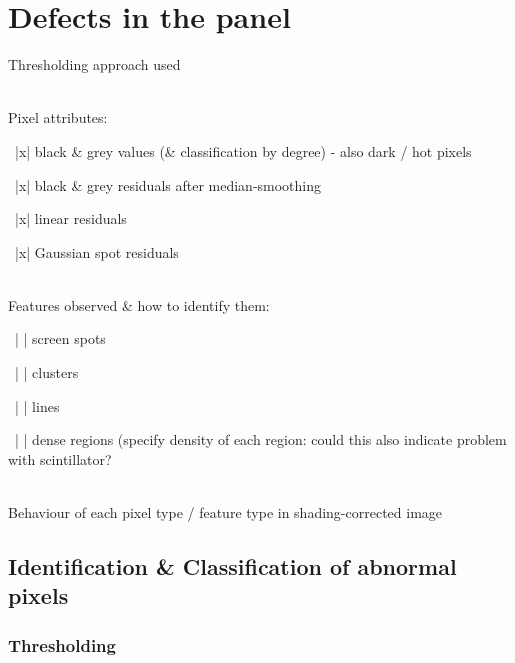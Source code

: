 \documentclass[\main/IO-Pixels.tex]{subfiles}
\begin{document}
\section{Defects in the panel}

\begin{outline}

Thresholding approach used

\\
Pixel attributes:

\-\ |x| black \& grey values (\& classification by degree) - also dark / hot pixels
    
\-\ |x| black \& grey residuals after median-smoothing
    
\-\ |x| linear residuals
    
\-\ |x| Gaussian spot residuals

\\
Features observed \& how to identify them:

\-\ | | screen spots
    
\-\ | | clusters
    
\-\ | | lines
    
\-\ | | dense regions (specify density of each region: could this also indicate problem with scintillator?
    
\\
Behaviour of each pixel type / feature type in shading-corrected image

\end{outline}


\subsection{Identification \& Classification of abnormal pixels}


\subsubsection{Thresholding}

\label{sec:thresholding}
\end{document}
